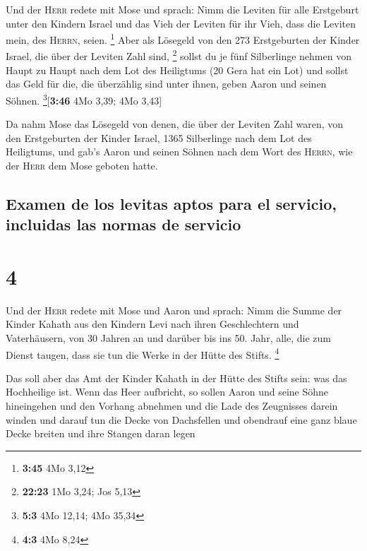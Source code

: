  Und der \textsc{Herr} redete mit Mose und sprach:
 Nimm die Leviten für alle Erstgeburt unter den Kindern
Israel und das Vieh der Leviten für ihr Vieh, dass die Leviten mein, des
\textsc{Herrn}, seien. \footnote{\textbf{3:45} 4Mo 3,12} 
Aber als Lösegeld von den 273 Erstgeburten der Kinder Israel, die über
der Leviten Zahl sind, \footnote{\textbf{22:23} 1Mo 3,24; Jos 5,13}
 sollst du je fünf Silberlinge nehmen von Haupt zu Haupt
nach dem Lot des Heiligtums (20 Gera hat ein Lot)  und
sollst das Geld für die, die überzählig sind unter ihnen, geben Aaron
und seinen Söhnen. \footnote{\textbf{5:3} 4Mo 12,14; 4Mo 35,34}{[}\textbf{3:46}
4Mo 3,39; 4Mo 3,43{]}

 Da nahm Mose das Lösegeld von denen, die über der
Leviten Zahl waren,  von den Erstgeburten der Kinder
Israel, 1365 Silberlinge nach dem Lot des Heiligtums, 
und gab's Aaron und seinen Söhnen nach dem Wort des \textsc{Herrn}, wie
der \textsc{Herr} dem Mose geboten hatte.

\hypertarget{examen-de-los-levitas-aptos-para-el-servicio-incluidas-las-normas-de-servicio}{%
\subsection{Examen de los levitas aptos para el servicio, incluidas las
normas de
servicio}\label{examen-de-los-levitas-aptos-para-el-servicio-incluidas-las-normas-de-servicio}}

\hypertarget{section-3}{%
\section{4}\label{section-3}}

 Und der \textsc{Herr} redete mit Mose und Aaron und
sprach:  Nimm die Summe der Kinder Kahath aus den Kindern
Levi nach ihren Geschlechtern und Vaterhäusern,  von 30
Jahren an und darüber bis ins 50. Jahr, alle, die zum Dienst taugen,
dass sie tun die Werke in der Hütte des Stifts. \footnote{\textbf{4:3}
  4Mo 8,24}

 Das soll aber das Amt der Kinder Kahath in der Hütte des
Stifts sein: was das Hochheilige ist.  Wenn das Heer
aufbricht, so sollen Aaron und seine Söhne hineingehen und den Vorhang
abnehmen und die Lade des Zeugnisses darein winden  und
darauf tun die Decke von Dachsfellen und obendrauf eine ganz blaue Decke
breiten und ihre Stangen daran legen

